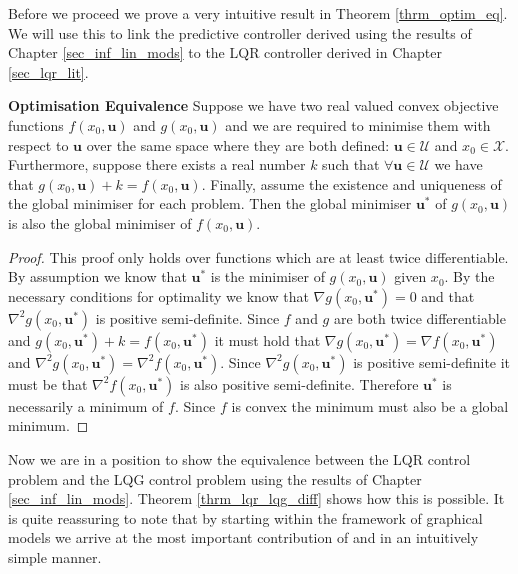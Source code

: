 Before we proceed we prove a very intuitive result in Theorem \ref{thrm_optim_eq}. We will use this to link the predictive controller derived using the results of Chapter \ref{sec_inf_lin_mods} to the LQR controller derived in Chapter \ref{sec_lqr_lit}.
\begin{thrm}
\textbf{Optimisation Equivalence} Suppose we have two real valued convex objective functions $f(x_0,\mathbf{u})$ and $g(x_0, \mathbf{u})$ and we are required to minimise them with respect to $\mathbf{u}$ over the same space where they are both defined: $\mathbf{u}\in \mathcal{U}$ and $x_0 \in \mathcal{X}$. Furthermore, suppose there exists a real number $k$ such that $\forall \mathbf{u} \in \mathcal{U}$ we have that $g(x_0, \mathbf{u}) + k = f(x_0, \mathbf{u})$. Finally, assume the existence and uniqueness of the global minimiser for each problem. Then the global minimiser $\mathbf{u}^*$ of $g(x_0, \mathbf{u})$ is also the global minimiser of $f(x_0, \mathbf{u})$.
\label{thrm_optim_eq}
\end{thrm}
\begin{proof}
This proof only holds over functions which are at least twice differentiable. By assumption we know that $\mathbf{u}^*$ is the minimiser of $g(x_0, \mathbf{u})$ given $x_0$. By the necessary conditions for optimality \cite{forst} we know that $\nabla g(x_0, \mathbf{u}^*) = 0$ and that $\nabla ^2 g(x_0, \mathbf{u}^*)$ is positive semi-definite. Since $f$ and $g$ are both twice differentiable and  $g(x_0, \mathbf{u}^*) + k = f(x_0, \mathbf{u}^*)$ it must hold that $\nabla g(x_0, \mathbf{u}^*) = \nabla f(x_0, \mathbf{u}^*)$ and  $\nabla ^2 g(x_0, \mathbf{u}^*) = \nabla ^2 f(x_0, \mathbf{u}^*)$. Since $\nabla ^2 g(x_0, \mathbf{u}^*)$ is positive semi-definite it must be that $\nabla ^2 f(x_0, \mathbf{u}^*)$ is also positive semi-definite. Therefore $\mathbf{u}^*$ is necessarily a minimum of $f$. Since $f$ is convex the minimum must also be a global minimum.
\end{proof}
Now we are in a position to show the equivalence between the LQR control problem and the LQG control problem using the results of Chapter \ref{sec_inf_lin_mods}. Theorem \ref{thrm_lqr_lqg_diff} shows how this is possible. It is quite reassuring to note that by starting within the framework of graphical models we arrive at the most important contribution of \cite{yan1} and \cite{yan2} in an intuitively simple manner.
